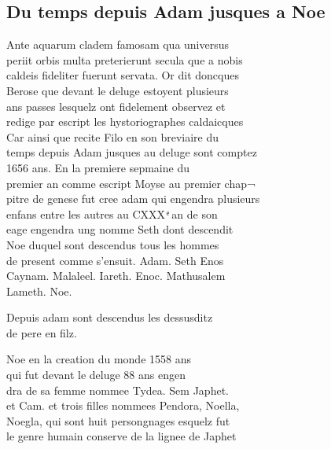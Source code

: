 \documentclass[12pt]{article}
\begin{document}
\newpage






\subsection*{Du temps depuis Adam jusques a Noe}


Ante aquarum cladem famosam qua universus\\
periit orbis
              multa preterierunt secula que a nobis\\
caldeis fideliter fuerunt
              servata. Or dit doncques\\
Berose que devant le
          deluge estoyent plusieurs\\
ans passes lesquelz ont fidelement observez et\\
redige par escript les hystoriographes caldaicques\\
Car ainsi que recite
            Filo en son breviaire du\\
temps depuis Adam jusques au deluge sont comptez\\
1656 ans. En la
          premiere sepmaine du\\
premier an comme escript Moyse au premier chap¬\\
pitre de genese
          fut cree adam qui engendra plusieurs\\
enfans entre les autres au CXXX ͤ an de
            son\\
eage engendra ung nomme Seth dont
            descendit\\
Noe duquel sont descendus tous les
            hommes\\
de present comme s'ensuit. Adam.
            Seth Enos\\
Caynam. Malaleel. Iareth. Enoc. Mathusalem\\
Lameth. Noe.



Depuis adam sont descendus les dessusditz\\
de pere en filz.



Noe en la creation du monde 1558 ans\\
qui fut devant le deluge 88 ans engen\\
dra de sa femme nommee Tydea. Sem Japhet.\\
et Cam. et trois filles nommees
            Pendora,  Noella,\\
 Noegla, qui sont huit persongnages esquelz fut\\
le genre humain
          conserve de la lignee de Japhet
\end{document}
